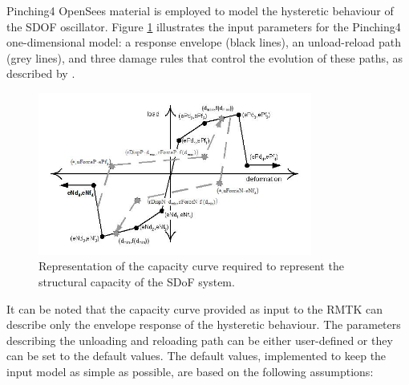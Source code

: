 Pinching4 OpenSees material is employed to model the hysteretic behaviour of the SDOF oscillator. Figure \ref{fig:backbone} illustrates the input parameters for the Pinching4 one-dimensional model: a response envelope (black lines), an unload-reload path (grey lines), and three damage rules that control the evolution of these paths, as described by \citep{LowesEtAl2003}.

\begin{figure}[htb]
  \centering
      \includegraphics[width=9cm]{figures/Pinching4.jpg}
  \caption{Representation of the capacity curve required to represent the structural capacity of the SDoF system.}
  \label{fig:backbone}
\end{figure}

It can be noted that the capacity curve provided as input to the RMTK can describe only the envelope response of the hysteretic behaviour. The parameters describing the unloading and reloading path can be either user-defined or they can be set to the default values. The default values, implemented to keep the input model as simple as possible, are based on the following assumptions:\\

